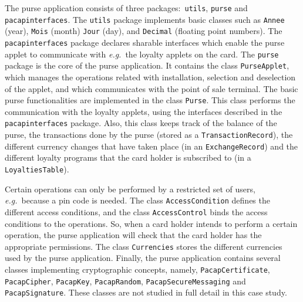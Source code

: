 \documentclass[a4paper]{llncs}
\begin{document}
The purse application consists of three packages$:$ \texttt{utils},
\texttt{purse} and \texttt{pacap\-interfaces}. The {\tt utils} package
implements basic classes such as \texttt{Annee} (year), 
\texttt{Mois} (month) \texttt{Jour} (day), and \texttt{Decimal}
(floating point numbers).  The \texttt{pacap\-interfaces} package
declares sharable interfaces which enable the purse applet to
communicate with \emph{e.g.}~the loyalty applets on the card.  The
\texttt{purse} package is the core of the purse application.  It
contains the class
\texttt{PurseApplet}, which manages the operations related with 
installation, selection and deselection of the applet, and which
communicates with the point of sale terminal.  The basic purse
functionalities are implemented in the class
\texttt{Purse}. This class performs the communication
with the loyalty applets, using the interfaces described in the
\texttt{pacapinterfaces} package.  Also, this class keeps track of the 
balance of the purse, the transactions done by the purse (stored as a
\texttt{TransactionRecord}), the different currency changes that have
taken place (in an \texttt{ExchangeRecord}) and the different
loyalty programs that the card holder is subscribed to (in a
\texttt{LoyaltiesTable}). 


Certain operations can only be performed by a restricted set of users,
\emph{e.g.}~because a pin code is needed.
The class \texttt{AccessCondition} defines the different access
conditions, and the class \texttt{AccessControl} binds the access conditions
to the operations. So, when a card holder intends to perform a certain
operation, the purse application will check that the card holder has
the appropriate permissions. %
The class \texttt{Currencies} stores the different currencies used by
the purse application.  Finally, the purse application contains several classes
implementing cryptographic concepts, namely, \texttt{PacapCertificate},
\texttt{PacapCipher}, \texttt{PacapKey}, \texttt{PacapRandom},
\texttt{PacapSecureMessaging} and \texttt{PacapSignature}. These
classes are not studied in full detail in this case study.
\end{document}
